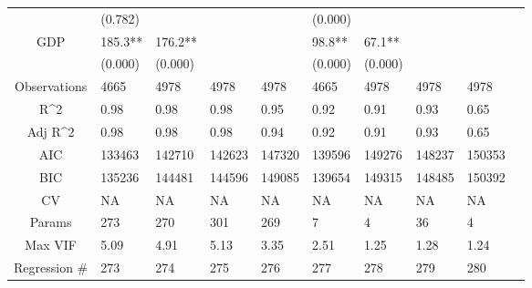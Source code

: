\documentclass{article}
\begin{document}
\begin{table}[H]
\begin{tabular}{|clllllllll|}
   & (0.782) &  &  &  & (0.000) &  &  &  & \\ 
  GDP & 185.3** & 176.2** &  &  & 98.8** & 67.1** &  &  & \\ 
   & (0.000) & (0.000) &  &  & (0.000) & (0.000) &  &  & \\ 
  \hline 
 Observations & 4665 & 4978 & 4978 & 4978 & 4665 & 4978 & 4978 & 4978 & \\ 
  R^2 & 0.98 & 0.98 & 0.98 & 0.95 & 0.92 & 0.91 & 0.93 & 0.65 & \\ 
  Adj R^2 & 0.98 & 0.98 & 0.98 & 0.94 & 0.92 & 0.91 & 0.93 & 0.65 & \\ 
  AIC & 133463 & 142710 & 142623 & 147320 & 139596 & 149276 & 148237 & 150353 & \\ 
  BIC & 135236 & 144481 & 144596 & 149085 & 139654 & 149315 & 148485 & 150392 & \\ 
  CV & NA & NA & NA & NA & NA & NA & NA & NA & \\ 
  Params & 273 & 270 & 301 & 269 & 7 & 4 & 36 & 4 & \\ 
  Max VIF & 5.09 & 4.91 & 5.13 & 3.35 & 2.51 & 1.25 & 1.28 & 1.24 & \\ 
  Regression \# & 273 & 274 & 275 & 276 & 277 & 278 & 279 & 280 & \\ 
   \hline
\end{tabular}
 
\end{table}
\end{document}
